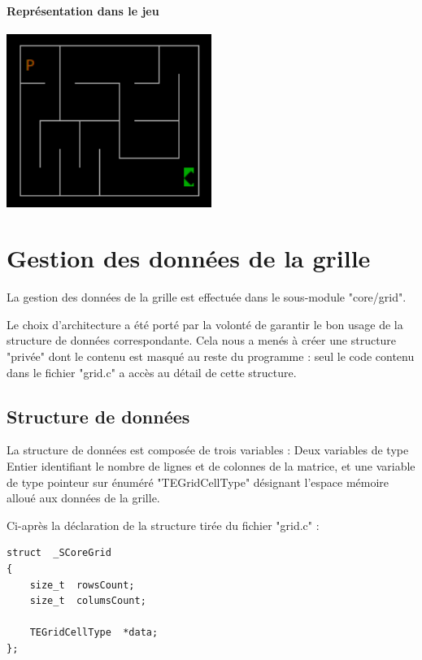 \documentclass{book}
\begin{document}
\paragraph{Représentation dans le jeu}
\begin{center}
	\includegraphics[width=0.5\textwidth]{rsrc/figure-grille_19x9.png}
\end{center}



\section{Gestion des données de la grille}

La gestion des données de la grille est effectuée dans le sous-module \mbox{"core/grid"}.

Le choix d'architecture a été porté par la volonté de garantir le bon usage de la structure de données correspondante. Cela nous a menés à créer une structure "privée" dont le contenu est masqué au reste du programme : seul le code contenu dans le fichier "grid.c" a accès au détail de cette structure.


\subsection{Structure de données}

La structure de données est composée de trois variables : Deux variables de type Entier identifiant le nombre de lignes et de colonnes de la matrice, et une variable de type pointeur sur énuméré "TEGridCellType" désignant l'espace mémoire alloué aux données de la grille.

Ci-après la déclaration de la structure tirée du fichier "grid.c" :
\begin{Verbatim}
struct  _SCoreGrid
{
	size_t  rowsCount;
	size_t  columsCount;
	
	TEGridCellType  *data;
};
\end{Verbatim}
\end{document}
